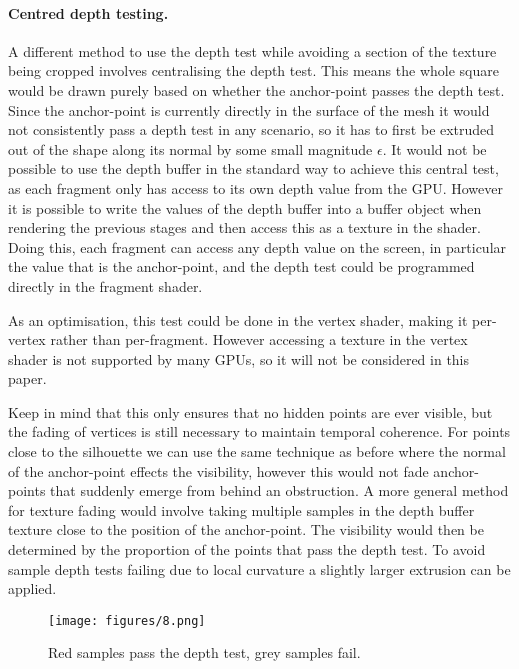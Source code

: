 \documentclass[a4paper, 12pt]{article}
\begin{document}
\paragraph{Centred depth testing.}
A different method to use the depth test while avoiding a section of the texture being cropped involves centralising the depth test. This means the whole square would be drawn purely based on whether the anchor-point passes the depth test. Since the anchor-point is currently directly in the surface of the mesh it would not consistently pass a depth test in any scenario, so it has to first be extruded out of the shape along its normal by some small magnitude $\epsilon$. It would not be possible to use the depth buffer in the standard way to achieve this central test, as each fragment only has access to its own depth value from the GPU. However it is possible to write the values of the depth buffer into a buffer object when rendering the previous stages and then access this as a texture in the shader. Doing this, each fragment can access any depth value on the screen, in particular the value that is the anchor-point, and the depth test could be programmed directly in the fragment shader.

As an optimisation, this test could be done in the vertex shader, making it per-vertex rather than per-fragment. However accessing a texture in the vertex shader is not supported by many GPUs, so it will not be considered in this paper.

Keep in mind that this only ensures that no hidden points are ever visible, but the fading of vertices is still necessary to maintain temporal coherence. For points close to the silhouette we can use the same technique as before where the normal of the anchor-point effects the visibility, however this would not fade anchor-points that suddenly emerge from behind an obstruction. A more general method for texture fading would involve taking multiple samples in the depth buffer texture close to the position of the anchor-point. The visibility would then be determined by the proportion of the points that pass the depth test. To avoid sample depth tests failing due to local curvature a slightly larger extrusion can be applied.

\begin{figure}[htbp!]
  \centering
  \texttt{[image: figures/8.png]}
  \caption{Red samples pass the depth test, grey samples fail.}
\end{figure}
\end{document}
